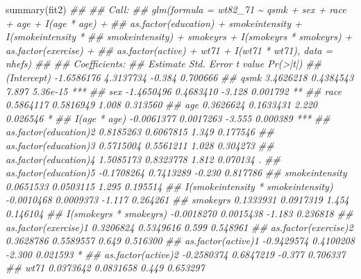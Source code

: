\documentclass[
  10pt,
  a4paper,
]{book}
\newenvironment{Shaded}{\begin{snugshade}}{\end{snugshade}}
\newcommand{\DocumentationTok}[1]{\textcolor[rgb]{0.37,0.37,0.37}{\textit{#1}}}
\newcommand{\FunctionTok}[1]{\textcolor[rgb]{0.28,0.35,0.67}{#1}}
\newcommand{\NormalTok}[1]{\textcolor[rgb]{0.00,0.46,0.62}{#1}}
\begin{document}
\begin{Shaded}
\begin{Highlighting}[]
\FunctionTok{summary}\NormalTok{(fit2)}
\DocumentationTok{\#\# }
\DocumentationTok{\#\# Call:}
\DocumentationTok{\#\# glm(formula = wt82\_71 \textasciitilde{} qsmk + sex + race + age + I(age * age) + }
\DocumentationTok{\#\#     as.factor(education) + smokeintensity + I(smokeintensity * }
\DocumentationTok{\#\#     smokeintensity) + smokeyrs + I(smokeyrs * smokeyrs) + as.factor(exercise) + }
\DocumentationTok{\#\#     as.factor(active) + wt71 + I(wt71 * wt71), data = nhefs)}
\DocumentationTok{\#\# }
\DocumentationTok{\#\# Coefficients:}
\DocumentationTok{\#\#                                      Estimate Std. Error t value Pr(\textgreater{}|t|)    }
\DocumentationTok{\#\# (Intercept)                        {-}1.6586176  4.3137734  {-}0.384 0.700666    }
\DocumentationTok{\#\# qsmk                                3.4626218  0.4384543   7.897 5.36e{-}15 ***}
\DocumentationTok{\#\# sex                                {-}1.4650496  0.4683410  {-}3.128 0.001792 ** }
\DocumentationTok{\#\# race                                0.5864117  0.5816949   1.008 0.313560    }
\DocumentationTok{\#\# age                                 0.3626624  0.1633431   2.220 0.026546 *  }
\DocumentationTok{\#\# I(age * age)                       {-}0.0061377  0.0017263  {-}3.555 0.000389 ***}
\DocumentationTok{\#\# as.factor(education)2               0.8185263  0.6067815   1.349 0.177546    }
\DocumentationTok{\#\# as.factor(education)3               0.5715004  0.5561211   1.028 0.304273    }
\DocumentationTok{\#\# as.factor(education)4               1.5085173  0.8323778   1.812 0.070134 .  }
\DocumentationTok{\#\# as.factor(education)5              {-}0.1708264  0.7413289  {-}0.230 0.817786    }
\DocumentationTok{\#\# smokeintensity                      0.0651533  0.0503115   1.295 0.195514    }
\DocumentationTok{\#\# I(smokeintensity * smokeintensity) {-}0.0010468  0.0009373  {-}1.117 0.264261    }
\DocumentationTok{\#\# smokeyrs                            0.1333931  0.0917319   1.454 0.146104    }
\DocumentationTok{\#\# I(smokeyrs * smokeyrs)             {-}0.0018270  0.0015438  {-}1.183 0.236818    }
\DocumentationTok{\#\# as.factor(exercise)1                0.3206824  0.5349616   0.599 0.548961    }
\DocumentationTok{\#\# as.factor(exercise)2                0.3628786  0.5589557   0.649 0.516300    }
\DocumentationTok{\#\# as.factor(active)1                 {-}0.9429574  0.4100208  {-}2.300 0.021593 *  }
\DocumentationTok{\#\# as.factor(active)2                 {-}0.2580374  0.6847219  {-}0.377 0.706337    }
\DocumentationTok{\#\# wt71                                0.0373642  0.0831658   0.449 0.653297    }

\end{Highlighting}
\end{Shaded}
\end{document}
